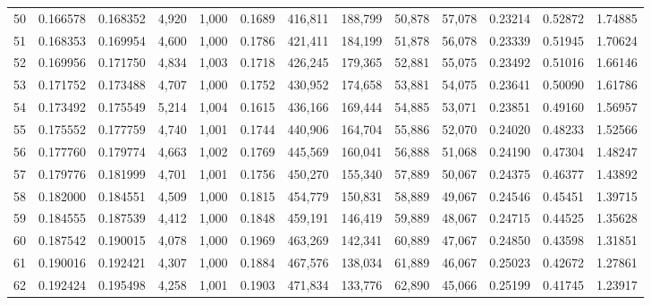 \begin{tabular}{rrrrrrrrrrrrr}
50  &  0.166578 &  0.168352 &   4,920 &  1,000 &                                     0.1689 &  416,811 &  188,799 &   50,878 &   57,078 &  0.23214 &  0.52872 &  1.74885 \\
51  &  0.168353 &  0.169954 &   4,600 &  1,000 &                                     0.1786 &  421,411 &  184,199 &   51,878 &   56,078 &  0.23339 &  0.51945 &  1.70624 \\
52  &  0.169956 &  0.171750 &   4,834 &  1,003 &                                     0.1718 &  426,245 &  179,365 &   52,881 &   55,075 &  0.23492 &  0.51016 &  1.66146 \\
53  &  0.171752 &  0.173488 &   4,707 &  1,000 &                                     0.1752 &  430,952 &  174,658 &   53,881 &   54,075 &  0.23641 &  0.50090 &  1.61786 \\
54  &  0.173492 &  0.175549 &   5,214 &  1,004 &                                     0.1615 &  436,166 &  169,444 &   54,885 &   53,071 &  0.23851 &  0.49160 &  1.56957 \\
55  &  0.175552 &  0.177759 &   4,740 &  1,001 &                                     0.1744 &  440,906 &  164,704 &   55,886 &   52,070 &  0.24020 &  0.48233 &  1.52566 \\
56  &  0.177760 &  0.179774 &   4,663 &  1,002 &                                     0.1769 &  445,569 &  160,041 &   56,888 &   51,068 &  0.24190 &  0.47304 &  1.48247 \\
57  &  0.179776 &  0.181999 &   4,701 &  1,001 &                                     0.1756 &  450,270 &  155,340 &   57,889 &   50,067 &  0.24375 &  0.46377 &  1.43892 \\
58  &  0.182000 &  0.184551 &   4,509 &  1,000 &                                     0.1815 &  454,779 &  150,831 &   58,889 &   49,067 &  0.24546 &  0.45451 &  1.39715 \\
59  &  0.184555 &  0.187539 &   4,412 &  1,000 &                                     0.1848 &  459,191 &  146,419 &   59,889 &   48,067 &  0.24715 &  0.44525 &  1.35628 \\
60  &  0.187542 &  0.190015 &   4,078 &  1,000 &                                     0.1969 &  463,269 &  142,341 &   60,889 &   47,067 &  0.24850 &  0.43598 &  1.31851 \\
61  &  0.190016 &  0.192421 &   4,307 &  1,000 &                                     0.1884 &  467,576 &  138,034 &   61,889 &   46,067 &  0.25023 &  0.42672 &  1.27861 \\
62  &  0.192424 &  0.195498 &   4,258 &  1,001 &                                     0.1903 &  471,834 &  133,776 &   62,890 &   45,066 &  0.25199 &  0.41745 &  1.23917 \\

\end{tabular}
